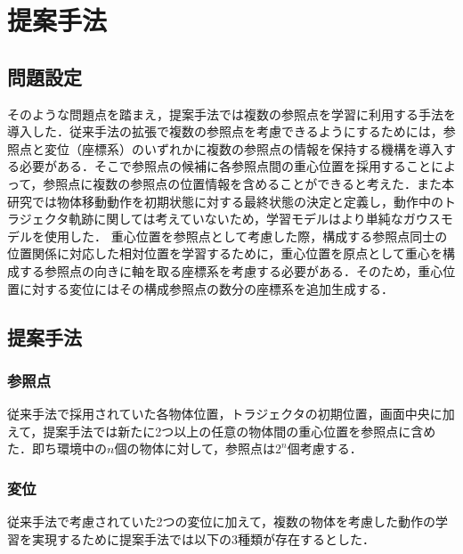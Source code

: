 ﻿%



\chapter{提案手法}

\section{問題設定}

そのような問題点を踏まえ，提案手法では複数の参照点を学習に利用する手法を導入した．従来手法の拡張で複数の参照点を考慮できるようにするためには，参照点と変位（座標系）のいずれかに複数の参照点の情報を保持する機構を導入する必要がある．そこで参照点の候補に各参照点間の重心位置を採用することによって，参照点に複数の参照点の位置情報を含めることができると考えた．また本研究では物体移動動作を初期状態に対する最終状態の決定と定義し，動作中のトラジェクタ軌跡に関しては考えていないため，学習モデルはより単純なガウスモデルを使用した．
重心位置を参照点として考慮した際，構成する参照点同士の位置関係に対応した相対位置を学習するために，重心位置を原点として重心を構成する参照点の向きに軸を取る座標系を考慮する必要がある．そのため，重心位置に対する変位にはその構成参照点の数分の座標系を追加生成する．

\section{提案手法}

\subsection{参照点}

従来手法で採用されていた各物体位置，トラジェクタの初期位置，画面中央に加えて，提案手法では新たに2つ以上の任意の物体間の重心位置を参照点に含めた．即ち環境中の$n$個の物体に対して，参照点は$2^{n}$個考慮する．

\subsection{変位}

従来手法で考慮されていた2つの変位に加えて，複数の物体を考慮した動作の学習を実現するために提案手法では以下の3種類が存在するとした．

